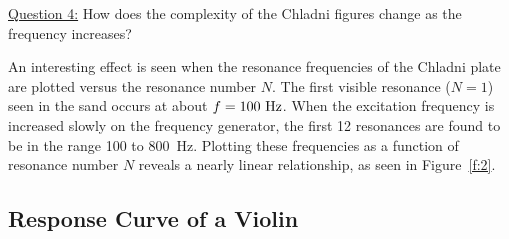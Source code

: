 \documentclass[11pt]{NSF}
\begin{document}
\underline{Question 4:}
How does the complexity of the Chladni figures change as the frequency increases?


An interesting effect is seen when the resonance frequencies of the
Chladni plate are plotted versus the resonance number $N$. The first
visible resonance ($N = 1$) seen in the sand occurs at about 
$f = 100 ~{\rm Hz}$.
When the excitation frequency is increased slowly on the frequency
generator, the first 12 resonances are found to be in the range 100 to
800~Hz. Plotting these frequencies as a function of resonance number
$N$ reveals a nearly linear relationship, as seen in Figure~\ref{f:2}. 

\subsection{Response Curve of a Violin}
\end{document}
